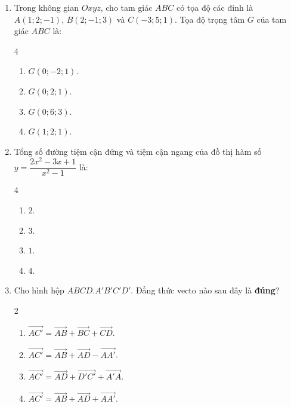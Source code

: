 \documentclass[12pt]{article}
\begin{document}
	\begin{enumerate}[label=\textbf{Câu \arabic*.}, leftmargin=*]
		\item Trong không gian $Oxyz$, cho tam giác $ABC$ có tọa độ các đỉnh là $A(1; 2; -1)$, $B(2; -1; 3)$ và $C(-3; 5; 1)$. Tọa độ trọng tâm $G$ của tam giác $ABC$ là:
		\begin{multicols}{4}
			\begin{enumerate}[label=\Alph*.]
				\item $G(0; -2; 1)$.
				\item $G(0; 2; 1)$.
				\item $G(0; 6; 3)$.
				\item $G(1; 2; 1)$.
			\end{enumerate}
		\end{multicols}
		
		\item Tổng số đường tiệm cận đứng và tiệm cận ngang của đồ thị hàm số $y = \dfrac{2x^2 - 3x + 1}{x^2 - 1}$ là:
		\begin{multicols}{4}
			\begin{enumerate}[label=\Alph*.]
				\item $2$.
				\item $3$.
				\item $1$.
				\item $4$.
			\end{enumerate}
		\end{multicols}
		
		\item Cho hình hộp $ABCD.A'B'C'D'$. Đẳng thức vecto nào sau đây là \textbf{đúng}?
		\begin{multicols}{2}
			\begin{enumerate}[label=\Alph*.]
				\item $\overrightarrow{AC'} = \overrightarrow{AB} + \overrightarrow{BC} + \overrightarrow{CD}$.
				\item $\overrightarrow{AC'} = \overrightarrow{AB} + \overrightarrow{AD} - \overrightarrow{AA'}$.
				\item $\overrightarrow{AC'} = \overrightarrow{AD} + \overrightarrow{D'C'} + \overrightarrow{A'A}$.
				\item $\overrightarrow{AC'} = \overrightarrow{AB} + \overrightarrow{AD} + \overrightarrow{AA'}$.
			\end{enumerate}
		\end{multicols}
		

\end{enumerate}
\end{document}
